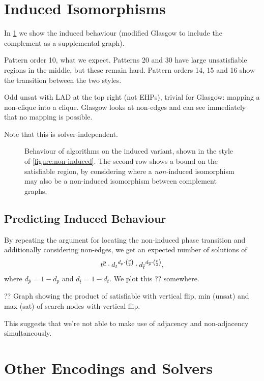\documentclass[letterpaper]{article}
\begin{document}
\section{Induced Isomorphisms}

In \cref{figure:induced} we show the induced behaviour (modified Glasgow to include the complement
as a supplemental graph).

Pattern order 10, what we expect. Patterns 20 and 30 have large unsatisfiable regions in the middle,
but these remain hard. Pattern orders 14, 15 and 16 show the transition between the two styles.

Odd unsat with LAD at the top right (not EHPs), trivial for Glasgow: mapping a non-clique into a
clique. Glasgow looks at non-edges and can see immediately that no mapping is possible.

Note that this is solver-independent.

\begin{figure*}[h]
    
    \caption{Behaviour of algorithms on the induced variant, shown in the style
    of \cref{figure:non-induced}. The second row shows a bound on the satisfiable region, by
    considering where a \emph{non-}induced isomorphism may also be a non-induced isomorphism between
    complement graphs.}\label{figure:induced}
\end{figure*}

\subsection{Predicting Induced Behaviour}

By repeating the argument for locating the non-induced phase transition and additionally considering
non-edges, we get an expected number of solutions of \[t^{\underline{p}} \cdot {d_t}^{d_p \cdot
\binom{p}{2}} \cdot {d_{\overline{t}}}^{d_{\overline{p}} \cdot \binom{p}{2}} \textnormal{,} \]
where $d_{\overline{p}} = 1 - d_p$ and $d_{\overline{t}} = 1 - d_t$. We plot this ?? somewhere.

?? Graph showing the product of satisfiable with vertical flip, min (unsat) and max (sat) of search
nodes with vertical flip.

This suggests that we're not able to make use of adjacency and non-adjacency simultaneously.

\section{Other Encodings and Solvers}
\end{document}
